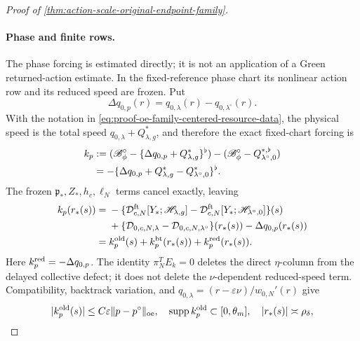 \begin{proof}[Proof of
\cref{thm:action-scale-original-endpoint-family}]
\paragraph{Phase and finite rows.}
The phase forcing is estimated directly; it is not an application of a
Green returned-action estimate.  In the fixed-reference phase chart its
nonlinear action row and its reduced speed are frozen.  Put
\begin{equation}
 \Delta q_{0,p}(r)=q_{0,\lambda}(r)-q_{0,\lambda^\circ}(r).
                                                        \label{eq:proof-oe-family-reduced-speed-difference}
\end{equation}
With the notation in
\cref{eq:proof-oe-family-centered-resource-data}, the physical speed is
the total speed \(q_{0,\lambda}+Q_{\lambda,g}^*\), and therefore the exact
fixed-chart forcing is
\begin{align}
 k_p
 &:=(\mathscr B_\phi^\circ
             -\{\Delta q_{0,p}+Q_{\lambda,g}^*\}^{\flat})
       -(\mathscr B_\phi^\circ
             -Q_{\lambda^\circ,0}^{*,\flat})\notag\\
 &=-\{\Delta q_{0,p}+Q_{\lambda,g}^*
             -Q_{\lambda^\circ,0}^*\}^{\flat}.   \label{eq:proof-oe-family-phase-exact-factorization}
\end{align}
The frozen \(\mathfrak p_*,Z_*,h_c,\ell_N\) terms cancel exactly, leaving
\begin{align}
 k_p(r_*(s))
 ={}&-\{\mathcal D_{c,N}^{\rm ft}
       [Y_*;\mathscr H_{\lambda,g}]
       -\mathcal D_{c,N}^{\rm ft}
       [Y_*;\mathscr H_{\lambda^\circ,0}]\}(s)\notag\\
 &+\{\mathcal D_{0,c,N,\lambda}
       -\mathcal D_{0,c,N,\lambda^\circ}\}(r_*(s))
 -\Delta q_{0,p}(r_*(s))\notag\\
 ={}&k_p^{\rm old}(s)+k_p^{\rm bt}(r_*(s))
       +k_p^{\rm red}(r_*(s)).
                                                        \label{eq:proof-oe-family-phase-old-backtrack-speed-split}
\end{align}
Here \(k_p^{\rm red}=-\Delta q_{0,p}\).  The identity
\(\pi_N^TE_k=0\) deletes the direct \(\eta\)-column from the delayed
collective defect; it does not delete the \(\nu\)-dependent reduced-speed
term.  Compatibility, backtrack variation, and
\(q_{0,\lambda}=(r-\varepsilon\nu)/w_{0,N}'(r)\) give
\begin{align}
 |k_p^{\rm old}(s)|
 &\le C\varepsilon\|p-p^\circ\|_{\rm oe},
 &&\operatorname{supp}k_p^{\rm old}\subset[0,\theta_m],
 \quad |r_*(s)|\asymp\rho_\delta,\notag\\

\end{align}
\end{proof}
